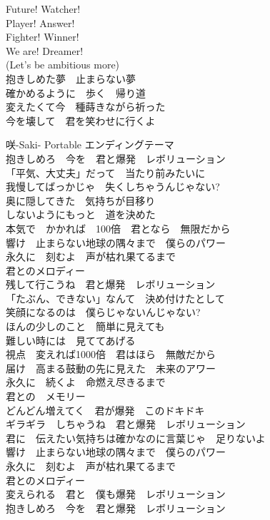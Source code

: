 {Future! Watcher!\\
Player! Answer!\\
Fighter! Winner!\\
We are! Dreamer!\\

(Let's be ambitious more)\\
抱きしめた夢　止まらない夢\\
確かめるように　歩く　帰り道\\
変えたくて今　種蒔きながら祈った\\

今を壊して　君を笑わせに行くよ\\
}

{咲-Saki- Portable エンディングテーマ}
{\quad\\[-.3em]\kasho
抱きしめろ　今を　君と爆発　レボリューション\\[-.3em]

「平気、大丈夫」だって　当たり前みたいに\\
我慢してばっかじゃ　失くしちゃうんじゃない?\\
奥に隠してきた　気持ちが目移り\\
しないようにもっと　道を決めた\\[-.3em]

本気で　かかれば　100倍　君となら　無限だから\\[-.3em]

響け　止まらない地球の隅々まで　僕らのパワー\\
永久に　刻むよ　声が枯れ果てるまで\\
君とのメロディー\\[-.3em]

残して行こうね　君と爆発　レボリューション\\[-.3em]

「たぶん、できない」なんて　決め付けたとして\\
笑顔になるのは　僕らじゃないんじゃない?\\
ほんの少しのこと　簡単に見えても\\
難しい時には　見ててあげる\\[-.3em]

視点　変えれば1000倍　君はほら　無敵だから\\[-.3em]

届け　高まる鼓動の先に見えた　未来のアワー\\
永久に　続くよ　命燃え尽きるまで\\
君との　メモリー\\[-.3em]

どんどん増えてく　君が爆発　このドキドキ\\
ギラギラ　しちゃうね　君と爆発　レボリューション\\[-.3em]

君に　伝えたい気持ちは確かなのに言葉じゃ　足りないよ\\[-.3em]

響け　止まらない地球の隅々まで　僕らのパワー\\
永久に　刻むよ　声が枯れ果てるまで\\
君とのメロディー\\[-.3em]

変えられる　君と　僕も爆発　レボリューション\\
抱きしめろ　今を　君と爆発　レボリューション
}

